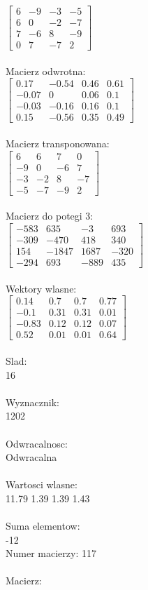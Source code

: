 \documentclass[a4paper,12pt]{article}
\begin{document}
$\begin{bmatrix} 6&-9&-3&-5\\6&0&-2&-7\\7&-6&8&-9\\0&7&-7&2 \end{bmatrix}$
\\
\\
Macierz odwrotna:\\

$\begin{bmatrix} 0.17&-0.54&0.46&0.61\\-0.07&0&0.06&0.1\\-0.03&-0.16&0.16&0.1\\0.15&-0.56&0.35&0.49 \end{bmatrix}$
\\
\\
Macierz transponowana:\\

$\begin{bmatrix} 6&6&7&0\\-9&0&-6&7\\-3&-2&8&-7\\-5&-7&-9&2 \end{bmatrix}$
\\
\\
Macierz do potegi 3:\\

$\begin{bmatrix} -583&635&-3&693\\-309&-470&418&340\\154&-1847&1687&-320\\-294&693&-889&435 \end{bmatrix}$
\\
\\
Wektory wlasne:\\

$\begin{bmatrix} 0.14&0.7&0.7&0.77\\-0.1&0.31&0.31&0.01\\-0.83&0.12&0.12&0.07\\0.52&0.01&0.01&0.64 \end{bmatrix}$
\\
\\
Slad:\\
16
\\
\\
Wyznacznik:\\
1202
\\
\\
Odwracalnosc:\\
Odwracalna
\\
\\
Wartosci wlasne:\\
11.79 1.39 1.39 1.43
\\
\\
Suma elementow:\\
-12
\\
\newpage
Numer macierzy:
117
\\
\\
Macierz:\\
\end{document}
